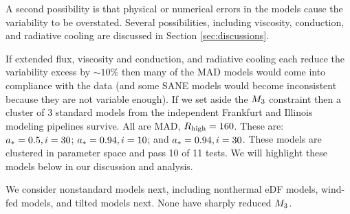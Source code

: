 A second possibility is that physical or numerical errors in the models cause the variability to be overstated.  Several possibilities, including viscosity, conduction, and radiative cooling are discussed in Section \ref{sec:discussions}.

If extended flux, viscosity and conduction, and radiative cooling each reduce the variability excess by $\sim 10\%$ then many of the MAD models would come into compliance with the data (and some SANE models would become inconsistent because they are not variable enough).  If we set aside the $M_{3}$ constraint then a cluster of 3 standard models from the independent  Frankfurt and Illinois modeling pipelines survive.  All are MAD, $R_\mathrm{high} = 160$.  These are: $a_* = 0.5, i = 30$; $a_* = 0.94, i = 10$; and $a_* = 0.94, i = 30$.  These models are clustered in parameter space and pass 10 of 11 tests.  We will highlight these models below in our discussion and analysis.

We consider nonstandard models next, including nonthermal eDF models, wind-fed models, and tilted models next.  None have sharply reduced $M_{3}$.






